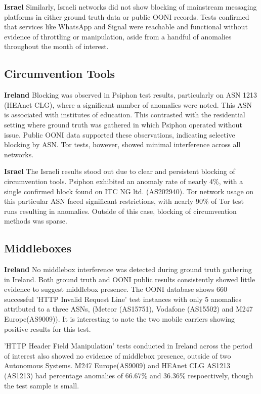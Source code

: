 \large\textbf{Israel}
Similarly, Israeli networks did not show blocking of mainstream messaging platforms in either ground truth data or public OONI records. Tests confirmed that services like WhatsApp and Signal were reachable and functional without evidence of throttling or manipulation, aside from a handful of anomalies throughout the month of interest.

\subsection{Circumvention Tools}
\large\textbf{Ireland}
Blocking was observed in Psiphon test results, particularly on ASN 1213 (HEAnet CLG), where a significant number of anomalies were noted. This ASN is associated with institutes of education. This contrasted with the residential setting where ground truth was gathered in which Psiphon operated without issue. Public OONI data supported these observations, indicating selective blocking by ASN. Tor tests, however, showed minimal interference across all networks.

\large\textbf{Israel}
The Israeli results stood out due to clear and persistent blocking of circumvention tools. Psiphon exhibited an anomaly rate of nearly 4\%, with a single confirmed block found on ITC NG ltd. (AS202940). Tor network usage on this particular ASN faced significant restrictions, with nearly 90\% of Tor test runs resulting in anomalies. Outside of this case, blocking of circumvention methods was sparse.

\subsection{Middleboxes}
\large\textbf{Ireland}
No middlebox interference was detected during ground truth gathering in Ireland. Both ground truth and OONI public results consistently showed  little evidence to suggest middlebox presence. The OONI database shows 660 successful 'HTTP Invalid Request Line' test instances with only 5 anomalies attributed to a three ASNs, (Meteor (AS15751), Vodafone (AS15502) and M247 Europe(AS9009)). It is interesting to note the two mobile carriers showing positive results for this test.

'HTTP Header Field Manipulation' tests conducted in Ireland across the period of interest also showed no evidence of middlebox presence, outside of two Autonomous Systems. M247 Europe(AS9009) and HEAnet CLG AS1213 (AS1213) had percentage anomalies of 66.67\% and 36.36\% respoectively, though the test sample is small.


